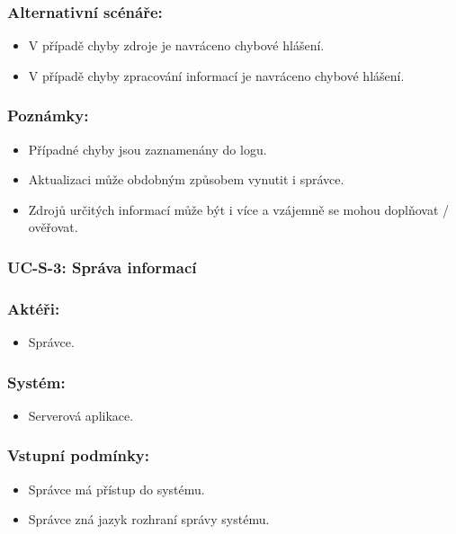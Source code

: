 \subsubsection*{Alternativní scénáře:}
\begin{itemize}
 \item V případě chyby zdroje je navráceno chybové hlášení.
 \item V případě chyby zpracování informací je navráceno chybové hlášení.
\end{itemize}
\subsubsection*{Poznámky:}
\begin{itemize}
 \item Případné chyby jsou zaznamenány do logu.
 \item Aktualizaci může obdobným způsobem vynutit i správce.
 \item Zdrojů určitých informací může být i více a vzájemně se mohou doplňovat / ověřovat.
\end{itemize}

\subsubsection{UC-S-3: Správa informací}
\subsubsection*{Aktéři:}
\begin{itemize}
 \item Správce.
\end{itemize}
\subsubsection*{Systém:}
\begin{itemize}
 \item Serverová aplikace.
\end{itemize}
\subsubsection*{Vstupní podmínky:}
\begin{itemize}
 \item Správce má přístup do systému.
 \item Správce zná jazyk rozhraní správy systému.
\end{itemize}
